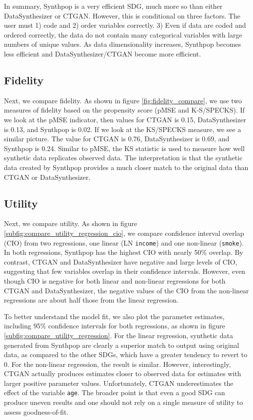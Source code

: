 \documentclass[runningheads]{llncs}
\begin{document}
In summary, Synthpop is a very efficient SDG, much more so than either DataSynthesizer or CTGAN.  However, this is conditional on three factors.  The user must 1) code and 2) order variables correctly.  3) Even if data are coded and ordered correctly, the data do not contain many categorical variables with large numbers of unique values.  As data dimensionality increases, Synthpop becomes less efficient and DataSynthesizer/CTGAN become more efficient.

\subsection{Fidelity}

Next, we compare fidelity.  As shown in figure \ref{fig:fidelity_compare}, we use two measures of fidelity based on the propensity score (pMSE and K-S/SPECKS).  If we look at the pMSE indicator, then values for CTGAN is 0.15, DataSynthesizer is 0.13, and Synthpop is 0.02.  If we look at the KS/SPECKS measure, we see a similar picture.  The value for CTGAN is 0.76, DataSynthesizer is 0.69, and Synthpop is 0.24.  Similar to pMSE, the KS statistic is used to measure how well synthetic data replicates observed data.  The interpretation is that the synthetic data created by Synthpop provides a much closer match to the original data than CTGAN or DataSynthesizer.  

\subsection{Utility}

Next, we compare utility.  As shown in figure \ref{subfig:compare_utility_regression_cio}, we compare confidence interval overlap (CIO) from two regressions, one linear (LN \texttt{income}) and one non-linear (\texttt{smoke}).  In both regressions, Synthpop has the highest CIO with nearly 50\% overlap.  By contrast, CTGAN and DataSynthesizer have negative and large levels of CIO, suggesting that few variables overlap in their confidence intervals.  However, even though CIO is negative for both linear and non-linear regressions for both CTGAN and DataSynthesizer, the negative values of the CIO from the non-linear regressions are about half those from the linear regression.

To better understand the model fit, we also plot the parameter estimates, including 95\% confidence intervals for both regressions, as shown in figure \ref{subfig:compare_utility_regression}.  For the linear regression, synthetic data generated from Synthpop are clearly a superior match to output using original data, as compared to the other SDGs, which have a greater tendency to revert to 0.  For the non-linear regression, the result is similar.  However, interestingly, CTGAN actually produces estimates closer to observed data for estimates with larger positive parameter values.  Unfortunately, CTGAN underestimates the effect of the variable \texttt{age}.  The broader point is that even a good SDG can produce uneven results and one should not rely on a single measure of utility to assess goodness-of-fit.
\end{document}
